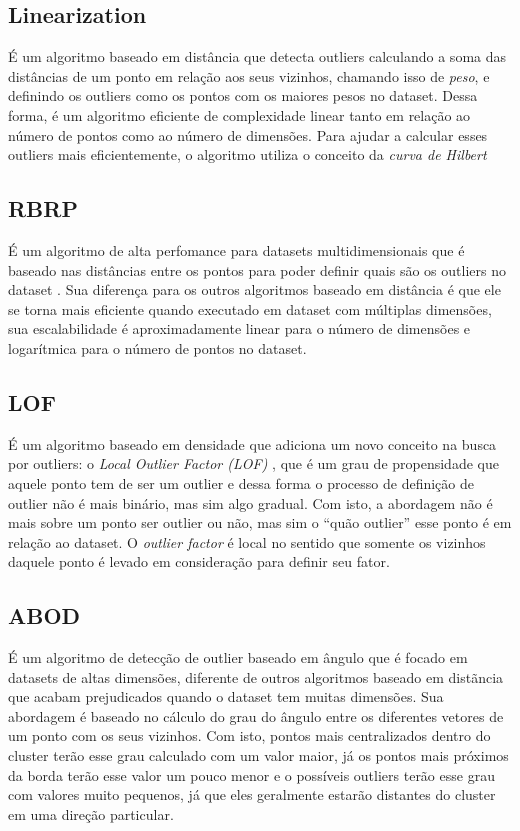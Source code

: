 \subsection{Linearization}

É um algoritmo baseado em distância \cite{10.1007/3-540-45681-3_2} que detecta outliers calculando a soma das distâncias de um ponto em relação aos seus vizinhos, chamando isso de \textit{peso}, e definindo os outliers como os pontos com os maiores pesos no dataset. Dessa forma, é um algoritmo eficiente de complexidade linear tanto em relação ao número de pontos como ao número de dimensões. Para ajudar a calcular esses outliers mais eficientemente, o algoritmo utiliza o conceito da \textit{curva de Hilbert}

\subsection{RBRP}

É um algoritmo de alta perfomance para datasets multidimensionais que é baseado nas distâncias entre os pontos para poder definir quais são os outliers no dataset \cite{Ghoting2006}. Sua diferença para os outros algoritmos baseado em distância é que ele se torna mais eficiente quando executado em dataset com múltiplas dimensões, sua escalabilidade é aproximadamente linear para o número de dimensões e logarítmica para o número de pontos no dataset.

\subsection{LOF}

É um algoritmo baseado em densidade que adiciona um novo conceito na busca por outliers: o \textit{Local Outlier Factor (LOF)} \cite{Breunig:2000:LID:335191.335388}, que é um grau de propensidade que aquele ponto tem de ser um outlier e dessa forma o processo de definição de outlier não é mais binário, mas sim algo gradual. Com isto, a abordagem não é mais sobre um ponto ser outlier ou não, mas sim o ``quão outlier'' esse ponto é em relação ao dataset. O \textit{outlier factor} é local no sentido que somente os vizinhos daquele ponto é levado em consideração para definir seu fator.

\subsection{ABOD}

É um algoritmo de detecção de outlier baseado em ângulo \cite{Kriegel:2008:AOD:1401890.1401946} que é focado em datasets de altas dimensões, diferente de outros algoritmos baseado em distãncia que acabam prejudicados quando o dataset tem muitas dimensões. Sua abordagem é baseado no cálculo do grau do ângulo entre os diferentes vetores de um ponto com os seus vizinhos. Com isto, pontos mais centralizados dentro do cluster terão esse grau calculado com um valor maior, já os pontos mais próximos da borda terão esse valor um pouco menor e o possíveis outliers terão esse grau com valores muito pequenos, já que eles geralmente estarão distantes do cluster em uma direção particular. 

